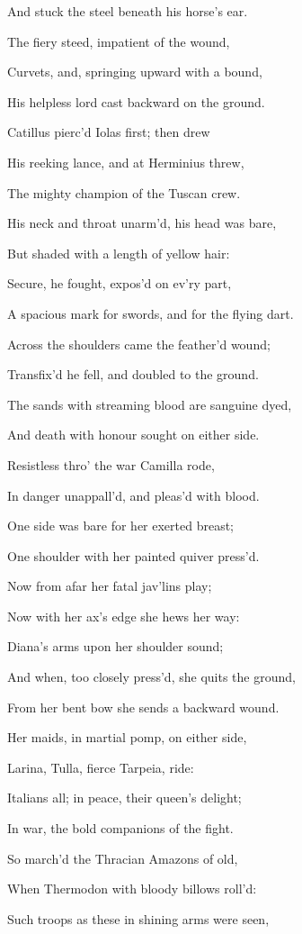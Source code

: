 And stuck the steel beneath his horse’s ear.

The fiery steed, impatient of the wound,

Curvets, and, springing upward with a bound,

His helpless lord cast backward on the ground.

Catillus pierc’d Iolas first; then drew

His reeking lance, and at Herminius threw,

The mighty champion of the Tuscan crew.

His neck and throat unarm’d, his head was bare,

But shaded with a length of yellow hair:

Secure, he fought, expos’d on ev’ry part,

A spacious mark for swords, and for the flying dart.

Across the shoulders came the feather’d wound;

Transfix’d he fell, and doubled to the ground.

The sands with streaming blood are sanguine dyed,

And death with honour sought on either side.

Resistless thro’ the war Camilla rode,

In danger unappall’d, and pleas’d with blood.

One side was bare for her exerted breast;

One shoulder with her painted quiver press’d.

Now from afar her fatal jav’lins play;

Now with her ax’s edge she hews her way:

Diana’s arms upon her shoulder sound;

And when, too closely press’d, she quits the ground,

From her bent bow she sends a backward wound.

Her maids, in martial pomp, on either side,

Larina, Tulla, fierce Tarpeia, ride:

Italians all; in peace, their queen’s delight;

In war, the bold companions of the fight.

So march’d the Thracian Amazons of old,

When Thermodon with bloody billows roll’d:

Such troops as these in shining arms were seen,

